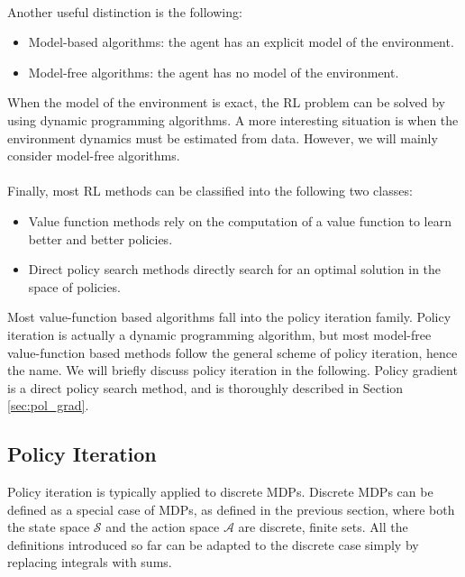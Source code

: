 \paragraph{} %
Another useful distinction is the following:
\begin{itemize}
\item Model-based algorithms: the agent has an explicit model of the environment.
\item Model-free algorithms: the agent has no model of the environment.
\end{itemize}
When the model of the environment is exact, the \ac{RL} problem can be solved by using dynamic programming algorithms. A more interesting situation is when the environment dynamics must be estimated from data. However, we will mainly consider model-free algorithms.
\paragraph{} %
Finally, most \ac{RL} methods can be classified into the following two classes:
\begin{itemize}
\item Value function methods rely on the computation of a value function to learn better and better policies.
\item Direct policy search methods directly search for an optimal solution in the space of policies.
\end{itemize}
Most value-function based algorithms fall into the policy iteration family. Policy iteration is actually a dynamic programming algorithm, but most model-free value-function based methods follow the general scheme of policy iteration, hence the name. We will briefly discuss policy iteration in the following.
Policy gradient is a direct policy search method, and is thoroughly described in Section \ref{sec:pol_grad}.

\subsection{Policy Iteration}\label{sec:pol_iter}
Policy iteration is typically applied to discrete \ac{MDP}s. Discrete \ac{MDP}s can be defined as a special case of \ac{MDP}s, as defined in the previous section, where both the state space $\mathcal{S}$ and the action space $\mathcal{A}$ are discrete, finite sets. All the definitions introduced so far can be adapted to the discrete case simply by replacing integrals with sums.
